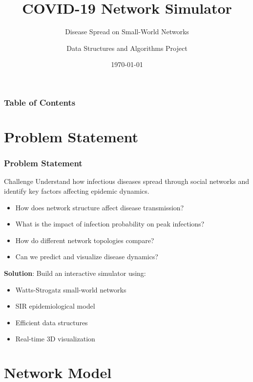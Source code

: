 \documentclass{beamer}
\title[COVID Network Simulator]{COVID-19 Network Simulator}
\subtitle{Disease Spread on Small-World Networks}
\author{Data Structures and Algorithms Project}
\date{\today}
\institute{3rd Semester DSA}
\begin{document}
\frame{\titlepage}

\begin{frame}
\frametitle{Table of Contents}
\tableofcontents
\end{frame}

\section{Problem Statement}

\begin{frame}
\frametitle{Problem Statement}
\begin{block}{Challenge}
Understand how infectious diseases spread through social networks and identify key factors affecting epidemic dynamics.
\end{block}

\begin{itemize}
    \item How does network structure affect disease transmission?
    \item What is the impact of infection probability on peak infections?
    \item How do different network topologies compare?
    \item Can we predict and visualize disease dynamics?
\end{itemize}

\vspace{1cm}

\textbf{Solution}: Build an interactive simulator using:
\begin{itemize}
    \item Watts-Strogatz small-world networks
    \item SIR epidemiological model
    \item Efficient data structures
    \item Real-time 3D visualization
\end{itemize}
\end{frame}

\section{Network Model}
\end{document}
